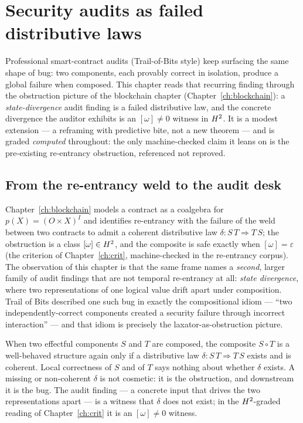 \chapter{Security audits as failed distributive laws}
\label{ch:security}
Professional smart-contract audits (Trail-of-Bits style) keep surfacing the same
shape of bug: two components, each provably correct in isolation, produce a
global failure when composed. This chapter reads that recurring finding through
the obstruction picture of the blockchain chapter (Chapter~\ref{ch:blockchain}):
a \emph{state-divergence} audit finding is a failed distributive law, and the
concrete divergence the auditor exhibits is an $[\omega]\neq0$ witness in
$H^2$. It is a modest extension --- a reframing with predictive bite, not a new
theorem --- and is graded \emph{computed} throughout: the only machine-checked
claim it leans on is the pre-existing re-entrancy obstruction, referenced not
reproved.

\section{From the re-entrancy weld to the audit desk}
\label{sec:security-frame}

Chapter~\ref{ch:blockchain} models a contract as a coalgebra for
$p(X)=(O\times X)^{I}$ and identifies re-entrancy with the failure of the weld
between two contracts to admit a coherent distributive law
$\delta\colon S\,T\Rightarrow T\,S$; the obstruction is a class
$[\omega]\in H^2$, and the composite is safe exactly when
$[\omega]=\varepsilon$ (the criterion of Chapter~\ref{ch:crit}, machine-checked
in the re-entrancy corpus). The observation of this chapter is that the same
frame names a \emph{second}, larger family of audit findings that are not
temporal re-entrancy at all: \emph{state divergence}, where two representations
of one logical value drift apart under composition. Trail of Bits described one
such bug in exactly the compositional idiom --- ``two independently-correct
components created a security failure through incorrect interaction'' --- and
that idiom is precisely the laxator-as-obstruction picture.

When two effectful components $S$ and $T$ are composed, the composite $S\circ T$
is a well-behaved structure again only if a distributive law
$\delta\colon S\,T\Rightarrow T\,S$ exists and is coherent. Local correctness of
$S$ and of $T$ says nothing about whether $\delta$ exists. A missing or
non-coherent $\delta$ is not cosmetic: it is the obstruction, and downstream it
is the bug. The audit finding --- a concrete input that drives the two
representations apart --- is a witness that $\delta$ does not exist; in the
$H^2$-graded reading of Chapter~\ref{ch:crit} it is an $[\omega]\neq0$ witness.

